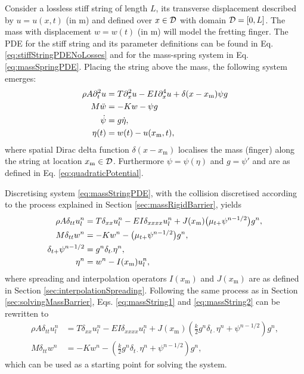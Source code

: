 Consider a lossless stiff string of length $L$, its transverse displacement described by $u = u(x,t)$ (in m) and defined over $x\in \mathcal{D}$ with domain $\mathcal{D} = [0, L]$. The mass with displacement $w = w(t)$ (in m) will model the fretting finger. The PDE for the stiff string and its parameter definitions can be found in Eq. \eqref{eq:stiffStringPDENoLosses} and for the mass-spring system in Eq. \eqref{eq:massSpringPDE}. Placing the string above the mass, the following system emerges:
\begin{subequations}\label{eq:massStringPDE}
\begin{align}   
    \rho A \partial_t^2 u & =T\partial_x^2 u - EI\partial_x^4 u + \delta(x-x_\text{m}) \psi g \label{eq:massStringPDE1}\\
    M \ddot w &=-Kw - \psi g\label{eq:massStringPDE2}\\
    \dot\psi &= g \dot\eta,\label{eq:massStringPDE3}\\
    \eta(t) &= w(t) - u(x_\text{m}, t),\label{eq:massStringPDE4}
\end{align}
\end{subequations}
where spatial Dirac delta function $\delta(x-x_\text{m})$ localises the mass (finger) along the string at location $x_\text{m} \in \mathcal{D}$. Furthermore $\psi = \psi(\eta)$ and $g=\psi'$ and are as defined in Eq. \eqref{eq:quadraticPotential}. 

Discretising system \eqref{eq:massStringPDE}, with the collision discretised according to the process explained in Section \ref{sec:massRigidBarrier}, yields
\begin{subequations}
    \begin{align}   
        \rho A \delta_{tt}u^n_l & =T\delta_{xx}u^n_l - EI\delta_{xxxx}u_l^n + J(x_\text{m}) \big(\mu_{t+}\psi^{n-1/2}\big)g^n, \label{eq:massString1}\\
        M \delta_{tt}w^n &=-Kw^n - \big(\mu_{t+}\psi^{n-1/2}\big)g^n,\label{eq:massString2}\\
        \delta_{t+}\psi^{n-1/2} &= g^n\delta_{t\cdot}\eta^n,\label{eq:massString3}\\
        \eta^n &= w^n - I(x_\text{m})u_l^n,\label{eq:massString4}
    \end{align}
\end{subequations}
where spreading and interpolation operators $I(x_\text{m})$ and $J(x_\text{m})$ are as defined in Section \ref{sec:interpolationSpreading}. Following the same process as in Section \ref{sec:solvingMassBarrier}, Eqs. \eqref{eq:massString1} and \eqref{eq:massString2} can be rewritten to 
\begin{subequations}\label{eq:massStringComb}
    \begin{align}
        \rho A \delta_{tt}u^n_l & =T\delta_{xx}u^n_l - EI\delta_{xxxx}u_l^n + J(x_\text{m}) \left(\frac{k}{2}g^n\delta_{t\cdot}\eta^n + \psi^{n-1/2}\right)g^n,\label{eq:massStringComb1}\\
        M \delta_{tt}w^n &=-Kw^n - \left(\frac{k}{2}g^n\delta_{t\cdot}\eta^n + \psi^{n-1/2}\right)g^n,\label{eq:massStringComb2}
    \end{align}
\end{subequations}
which can be used as a starting point for solving the system.

